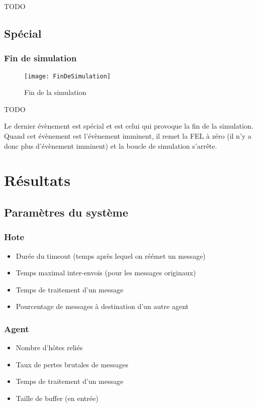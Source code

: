 \documentclass[a4paper,11pt]{article}
\begin{document}
TODO




\subsection{Spécial}

\subsubsection{Fin de simulation}

\begin{figure}[h!t]
  \centering
    \texttt{[image: FinDeSimulation]}
  \caption{Fin de la simulation}
  \label{fig:fin-de-simulation}
\end{figure}

TODO

Le dernier évènement est spécial et est celui qui provoque la fin de la simulation. Quand cet évènement est l'évènement imminent, il remet la FEL à zéro (il n'y a donc plus d'évènement imminent) et la boucle de simulation s'arrête.

\section{Résultats}
\subsection{Paramètres du système}

\subsubsection{Hote}
\begin{itemize}
 \item Durée du timeout (temps après lequel on réémet un message)
 \item Temps maximal inter-envois (pour les messages originaux)
 \item Temps de traitement d'un message
 \item Pourcentage de messages à destination d'un autre agent
\end{itemize}


\subsubsection{Agent}

\begin{itemize}
 \item Nombre d'hôtes reliés
 \item Taux de pertes brutales de messages
 \item Temps de traitement d'un message
 \item Taille de buffer (en entrée)
\end{itemize}
\end{document}
